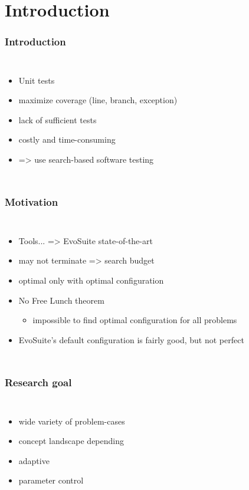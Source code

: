 \section{Introduction} 

\begin{frame}
	\frametitle{Introduction}
	
	\begin{columns}[c]
		
		\column{\textwidth}
		\begin{itemize}
			\item Unit tests
			\item maximize coverage (line, branch, exception)
			\item lack of sufficient tests
			\item costly and time-consuming
			\item => use search-based software testing
		\end{itemize}
		
	\end{columns}
	
\end{frame}

\begin{frame}
	\frametitle{Motivation}
	
	\begin{columns}[c]
		
		\column{\textwidth}
		\begin{itemize}
			\item Tools... => EvoSuite state-of-the-art
			\item may not terminate => search budget
			\item optimal only with optimal configuration
			\item No Free Lunch theorem 
				\begin{itemize}
					\item impossible to find optimal configuration for all problems
				\end{itemize}
			\item EvoSuite's default configuration is fairly good, but not perfect
		\end{itemize}
		
	\end{columns}
	
\end{frame}

\begin{frame}
	\frametitle{Research goal}
	
	\begin{columns}[c]
		
		\column{\textwidth}
		\begin{itemize}
			\item wide variety of problem-cases
			\item concept landscape depending 
			\item adaptive
			\item parameter control
		\end{itemize}
		
	\end{columns}
	
\end{frame}

